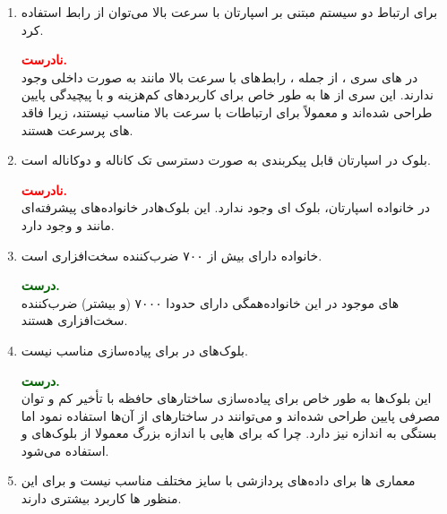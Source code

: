 \begin{enumerate}
	\item 
	برای ارتباط دو سیستم مبتنی بر اسپارتان  با سرعت بالا می‌توان از رابط  استفاده کرد.
	\begin{qsolve}
		\textbf{\textcolor{red}{نادرست.}}\\
		در  های سری ، از جمله ، رابط‌های با سرعت بالا مانند  به صورت داخلی وجود ندارند. این سری از  ها به طور خاص برای کاربردهای کم‌هزینه و با پیچیدگی پایین طراحی شده‌اند و معمولاً برای ارتباطات با سرعت بالا مناسب نیستند، زیرا فاقد  های پرسرعت هستند.
	\end{qsolve}
	
	
	
	
	\item 
بلوک  در اسپارتان قابل پیکربندی به صورت دسترسی تک کاناله و دوکاناله است.
	\begin{qsolve}
		\textbf{\textcolor{red}{نادرست.}}\\
		در خانواده اسپارتان، بلوک  ای وجود ندارد. این بلوک‌هادر خانواده‌های پیشرفته‌ای مانند  و  وجود دارد.
	\end{qsolve}
	
	
	
	
	\item 
خانواده  دارای بیش از ۷۰۰ ضرب‌کننده سخت‌افزاری است.
	\begin{qsolve}
		\textbf{\textcolor{darkgreen}{درست.}}\\
		\lr{FPGA}
		های موجود در این خانواده‌همگی دارای حدودا ۷۰۰۰ (و بیشتر) ضرب‌کننده سخت‌افزاری هستند.
	\end{qsolve}
	
	
	
	
	\item 
بلوک‌های  در  برای پیاده‌سازی  مناسب نیست.
	\begin{qsolve}
		\textbf{\textcolor{darkgreen}{درست.}}\\
	این بلوک‌ها به طور خاص برای پیاده‌سازی ساختارهای حافظه با تأخیر کم و توان مصرفی پایین طراحی شده‌اند و می‌توانند در ساختارهای  از آن‌ها استفاده نمود اما بستگی به اندازه  نیز دارد. چرا که برای هایی با اندازه بزرگ معمولا از بلوک‌های  و  استفاده می‌شود.
	\end{qsolve}
	
	
	\item 
معماری ها برای داده‌های پردازشی با سایز مختلف مناسب نیست و برای این منظور ها کاربرد بیشتری دارند.


\end{enumerate}

